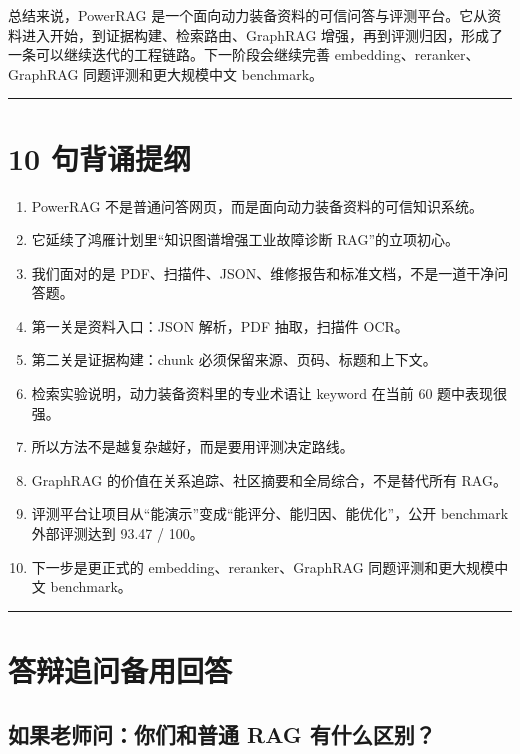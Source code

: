 \documentclass[11pt, a4paper]{ctexart}
\begin{document}
总结来说，PowerRAG 是一个面向动力装备资料的可信问答与评测平台。它从资料进入开始，到证据构建、检索路由、GraphRAG 增强，再到评测归因，形成了一条可以继续迭代的工程链路。下一阶段会继续完善 embedding、reranker、GraphRAG 同题评测和更大规模中文 benchmark。\\


\noindent\rule{\textwidth}{0.5pt}


\section*{10 句背诵提纲}

\begin{enumerate}[leftmargin=*]
\item PowerRAG 不是普通问答网页，而是面向动力装备资料的可信知识系统。
\item 它延续了鸿雁计划里“知识图谱增强工业故障诊断 RAG”的立项初心。
\item 我们面对的是 PDF、扫描件、JSON、维修报告和标准文档，不是一道干净问答题。
\item 第一关是资料入口：JSON 解析，PDF 抽取，扫描件 OCR。
\item 第二关是证据构建：chunk 必须保留来源、页码、标题和上下文。
\item 检索实验说明，动力装备资料里的专业术语让 keyword 在当前 60 题中表现很强。
\item 所以方法不是越复杂越好，而是要用评测决定路线。
\item GraphRAG 的价值在关系追踪、社区摘要和全局综合，不是替代所有 RAG。
\item 评测平台让项目从“能演示”变成“能评分、能归因、能优化”，公开 benchmark 外部评测达到 93.47 / 100。
\item 下一步是更正式的 embedding、reranker、GraphRAG 同题评测和更大规模中文 benchmark。
\end{enumerate}

\noindent\rule{\textwidth}{0.5pt}


\section*{答辩追问备用回答}

\subsection*{如果老师问：你们和普通 RAG 有什么区别？}
\end{document}
